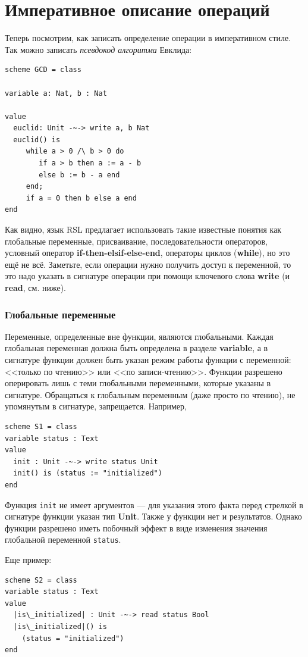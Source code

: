\documentclass[14pt, twoside]{extreport}
\newcommand{\head}[1]{\vspace{1cm}\subsubsection*{#1}}
\begin{document}
\section{Императивное описание операций}\label{imperative}

Теперь посмотрим, как записать определение операции в императивном стиле. Так можно записать \emph{псевдокод алгоритма} Евклида:

\begin{lstlisting}
scheme GCD = class

variable a: Nat, b : Nat

value
  euclid: Unit -~-> write a, b Nat
  euclid() is
     while a > 0 /\ b > 0 do
        if a > b then a := a - b
        else b := b - a end
     end;
     if a = 0 then b else a end
end
\end{lstlisting}

Как видно, язык RSL предлагает использовать такие известные понятия как глобальные переменные, присваивание, последовательности операторов, условный оператор \textbf{if-then-elsif-else-end}, операторы циклов (\textbf{while}), но это ещё не всё. Заметьте, если операции нужно получить доступ к переменной, то это надо указать в сигнатуре операции при помощи ключевого слова \textbf{write} (и \textbf{read}, см. ниже).

\head{Глобальные переменные}
Переменные, определенные вне функции, являются глобальными.
Каждая глобальная переменная должна быть определена в разделе \textbf{variable}, а в сигнатуре функции должен быть указан режим работы функции с переменной: <<только по чтению>> или <<по записи-чтению>>. Функции разрешено оперировать лишь с теми глобальными переменными, которые указаны в сигнатуре. Обращаться к глобальным переменным (даже просто по чтению), не упомянутым в сигнатуре, запрещается. Например,
\begin{lstlisting}
scheme S1 = class
variable status : Text
value
  init : Unit -~-> write status Unit
  init() is (status := "initialized")	
end
\end{lstlisting}

Функция \texttt{init} не имеет аргументов --- для указания этого факта перед стрелкой в сигнатуре функции указан тип \textbf{Unit}. Также у функции нет и результатов. Однако функции разрешено иметь побочный эффект в виде изменения значения глобальной переменной \texttt{status}.

Еще пример:
\begin{lstlisting}[escapechar={|}]
scheme S2 = class
variable status : Text
value
  |is\_initialized| : Unit -~-> read status Bool
  |is\_initialized|() is
	(status = "initialized")	
end
\end{lstlisting}
\end{document}
